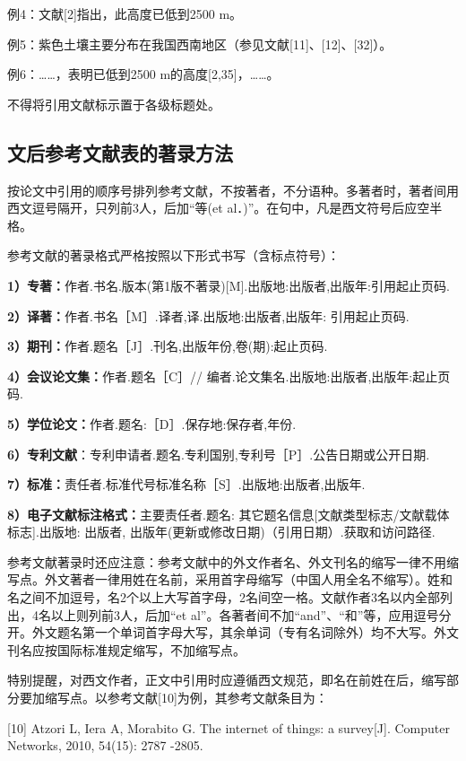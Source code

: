 例4：文献[2]指出，此高度已低到2500 m。

例5：紫色土壤主要分布在我国西南地区（参见文献[11]、[12]、[32]）。

例6：……，表明已低到2500 m的高度[2,35]，……。

不得将引用文献标示置于各级标题处。


\subsection{文后参考文献表的著录方法}


按论文中引用的顺序号排列参考文献，不按著者，不分语种。多著者时，著者间用西文逗号隔开，只列前3人，后加“等(et al．)”。在句中，凡是西文符号后应空半格。

参考文献的著录格式严格按照以下形式书写（含标点符号）：

\textbf{1）专著：}作者.书名.版本(第1版不著录)[M].出版地:出版者,出版年:引用起止页码.

\textbf{2）译著：}作者.书名［M］.译者,译.出版地:出版者,出版年: 引用起止页码.

\textbf{3）期刊：}作者.题名［J］.刊名,出版年份,卷(期):起止页码.

\textbf{4）会议论文集：}作者.题名［C］// 编者.论文集名.出版地:出版者,出版年:起止页码.

\textbf{5）学位论文：}作者.题名:［D］.保存地:保存者,年份.

\textbf{6）专利文献}：专利申请者.题名.专利国别,专利号［P］.公告日期或公开日期.

\textbf{7）标准：}责任者.标准代号标准名称［S］.出版地:出版者,出版年.

\textbf{8）电子文献标注格式：}主要责任者.题名: 其它题名信息[文献类型标志/文献载体标志].出版地: 出版者, 出版年(更新或修改日期)（引用日期）.获取和访问路径.

参考文献著录时还应注意：参考文献中的外文作者名、外文刊名的缩写一律不用缩写点。外文著者一律用姓在名前，采用首字母缩写（中国人用全名不缩写）。姓和名之间不加逗号，名2个以上大写首字母，2名间空一格。文献作者3名以内全部列出，4名以上则列前3人，后加“et al”。各著者间不加“and”、“和”等，应用逗号分开。外文题名第一个单词首字母大写，其余单词（专有名词除外）均不大写。外文刊名应按国际标准规定缩写，不加缩写点。

特别提醒，对西文作者，正文中引用时应遵循西文规范，即名在前姓在后，缩写部分要加缩写点。以参考文献[10]为例，其参考文献条目为：

[10]	Atzori L, Iera A, Morabito G. The internet of things: a survey[J]. Computer Networks, 2010, 54(15): 2787 -2805.

